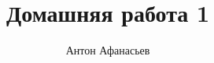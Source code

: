 \documentclass[10pt]{article}
\begin{document}
\title{Домашняя работа 1}
\author{Антон Афанасьев}
\maketitle
\end{document}
